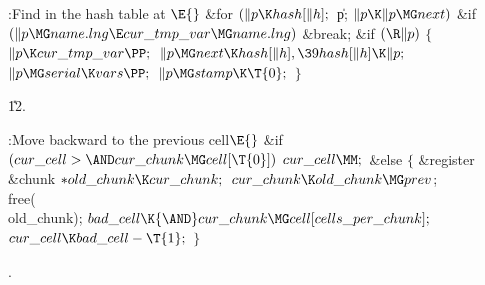 \B{}:Find  in the
hash table at \X${}\E{}$\6
\&{for} ${}(\|p\K\\{hash}[\|h];{}$ \|p; ${}\|p\K\|p\MG\\{next}){}$\1\6
\&{if} ${}(\|p\MG\\{name}.\\{lng}\E\\{cur\_tmp\_var}\MG\\{name}.\\{lng}){}$\1\5
\&{break};\2\2\6
\&{if} ${}(\R\|p){}$\5
${}\{{}$\1\6
${}\|p\K\\{cur\_tmp\_var}\PP;{}$\6
${}\|p\MG\\{next}\K\\{hash}[\|h],\39\\{hash}[\|h]\K\|p;{}$\6
${}\|p\MG\\{serial}\K\\{vars}\PP;{}$\6
${}\|p\MG\\{stamp}\K\T{0};{}$\6
\4${}\}{}$\2\par
\U12.\fi

\B{}:Move  backward to the previous
cell\X${}\E{}$\6
\&{if} ${}(\\{cur\_cell}>{\AND}\\{cur\_chunk}\MG\\{cell}[\T{0}]){}$\1\5
${}\\{cur\_cell}\MM;{}$\2\6
\&{else}\5
${}\{{}$\1\6
\&{register} \&{chunk} ${}{*}\\{old\_chunk}\K\\{cur\_chunk};{}$\7
${}\\{cur\_chunk}\K\\{old\_chunk}\MG\\{prev}{}$;\5
\\{free}(\\{old\_chunk});\6
${}\\{bad\_cell}\K{\AND}\\{cur\_chunk}\MG\\{cell}[\\{cells\_per\_chunk}];{}$\6
${}\\{cur\_cell}\K\\{bad\_cell}-\T{1};{}$\6
\4${}\}{}$\2\par
{}.\fi

